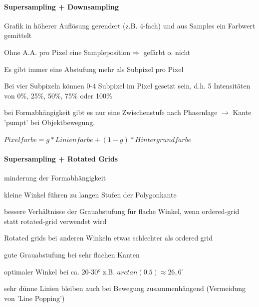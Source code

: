 \documentclass[landscape]{article}
\begin{document}
\begin{multicols}{3}
  \paragraph{Supersampling + Downsampling}
  \begin{itemize*}
    \item Grafik in höherer Auflösung gerendert (z.B. 4-fach) und aus Samples ein Farbwert gemittelt
    \item Ohne A.A. pro Pixel eine Sampleposition$\Rightarrow$ gefärbt o. nicht
    \item Es gibt immer eine Abstufung mehr als Subpixel pro Pixel
    \item Bei vier Subpixeln können 0-4 Subpixel im Pixel gesetzt sein, d.h. 5 Intensitäten von 0\%, 25\%, 50\%, 75\% oder 100\%
    \item bei Formabhängigkeit gibt es nur eine Zwischenstufe nach Phasenlage $\rightarrow$ Kante 'pumpt' bei Objektbewegung.
    \item $Pixelfarbe= g*Linienfarbe+(1-g)*Hintergrundfarbe$
  \end{itemize*}
  
  \paragraph{Supersampling + Rotated Grids}
  \begin{itemize*}
    \item minderung der Formabhängigkeit
    \item kleine Winkel führen zu langen Stufen der Polygonkante
    \item bessere Verhältnisse der Grauabstufung für flache Winkel, wenn ordered-grid statt rotated-grid verwendet wird
    \item Rotated grids bei anderen Winkeln etwas schlechter als ordered grid
    \item gute Grauabstufung bei sehr flachen Kanten
    \item optimaler Winkel bei ca. 20-30° z.B. $arctan(0.5) \approx 26,6^{\circ}$
    \item sehr dünne Linien bleiben auch bei Bewegung zusammenhängend (Vermeidung von 'Line Popping')
  \end{itemize*}
  

\end{multicols}
\end{document}
